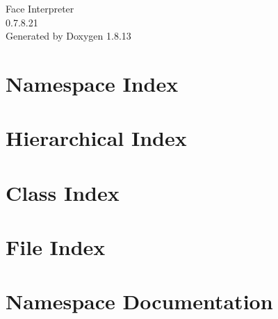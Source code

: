 \documentclass[twoside]{book}
\newcommand{\+}{\discretionary{\mbox{\scriptsize$\hookleftarrow$}}{}{}}
\newcommand{\clearemptydoublepage}{%
  \newpage{\pagestyle{empty}\cleardoublepage}%
}
\begin{document}
\hypersetup{pageanchor=false,
             bookmarksnumbered=true,
             pdfencoding=unicode
            }
\begin{titlepage}
\vspace*{7cm}
\begin{center}%
{\Large Face Interpreter \\[1ex]\large 0.\+7.\+8.\+21 }\\
\vspace*{1cm}
{\large Generated by Doxygen 1.8.13}\\
\end{center}
\end{titlepage}
\clearemptydoublepage
{}
\tableofcontents
\clearemptydoublepage
{}
\hypersetup{pageanchor=true}

\chapter{Namespace Index}

\chapter{Hierarchical Index}

\chapter{Class Index}

\chapter{File Index}

\chapter{Namespace Documentation}



\end{document}
